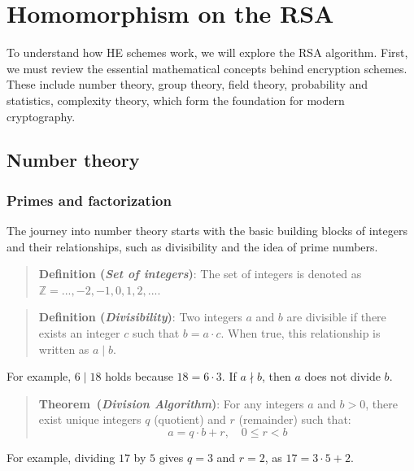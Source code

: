 \documentclass[
  letterpaper,
  DIV=11,
  numbers=noendperiod,
  oneside]{scrartcl}
\begin{document}
\section{Homomorphism on the RSA}\label{homomorphism-on-the-rsa}

To understand how HE schemes work, we will explore the RSA algorithm.
First, we must review the essential mathematical concepts behind
encryption schemes. These include number theory, group theory, field
theory, probability and statistics, complexity theory, which form the
foundation for modern cryptography.

\subsection{Number theory}\label{number-theory}

\subsubsection{Primes and factorization}\label{primes-and-factorization}

The journey into number theory starts with the basic building blocks of
integers and their relationships, such as divisibility and the idea of
prime numbers.

\begin{quote}
\textbf{Definition (\emph{Set of integers})}: The set of integers is
denoted as \(\mathbb{Z} = {..., -2, -1, 0, 1, 2, ...}\).
\end{quote}

\begin{quote}
\textbf{Definition (\emph{Divisibility})}: Two integers \(a\) and \(b\)
are divisible if there exists an integer \(c\) such that
\(b = a \cdot c\). When true, this relationship is written as
\(a \mid b\).
\end{quote}

For example, \(6 \mid 18\) holds because \(18 = 6 \cdot 3\). If
\(a \nmid b\), then \(a\) does not divide \(b\).

\begin{quote}
\textbf{Theorem~(\emph{Division Algorithm})}: For any integers \(a\) and
\(b > 0\), there exist unique integers \(q\) (quotient) and \(r\)
(remainder) such that: \[
a = q \cdot b + r, \quad 0 \leq r < b
\]
\end{quote}

For example, dividing \(17\) by \(5\) gives \(q = 3\) and \(r = 2\), as
\(17 = 3 \cdot 5 + 2\).
\end{document}
